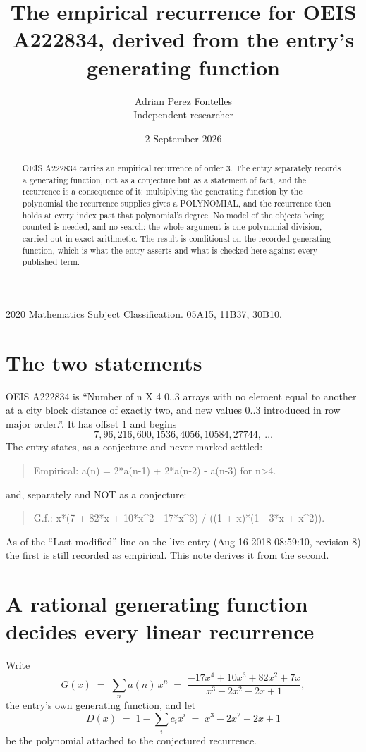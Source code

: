 \documentclass[11pt,a4paper]{article}
\title{The empirical recurrence for OEIS A222834, derived from the entry's generating function}
\author{Adrian Perez Fontelles\\ \small Independent researcher}
\date{2 September 2026}
\theoremstyle{plain}
\theoremstyle{definition}
\begin{document}
\maketitle

\begin{abstract}
OEIS A222834 carries an empirical recurrence of order $3$. The entry separately records a
generating function, not as a conjecture but as a statement of fact, and the recurrence is a
consequence of it: multiplying the generating function by the polynomial the recurrence
supplies gives a POLYNOMIAL, and the recurrence then holds at every index past that
polynomial's degree. No model of the objects being counted is needed, and no search: the
whole argument is one polynomial division, carried out in exact arithmetic. The result is
conditional on the recorded generating function, which is what the entry asserts and what is
checked here against every published term.
\end{abstract}

\noindent\small 2020 Mathematics Subject Classification. 05A15, 11B37, 30B10.\normalsize

\section{The two statements}

OEIS A222834 is ``Number of n X 4 0..3 arrays with no element equal to another at a city block distance of exactly two, and new values 0..3 introduced in row major order.''. It has offset $1$ and begins
\[
7, 96, 216, 600, 1536, 4056, 10584, 27744,\ \dots
\]
The entry states, as a conjecture and never marked settled:
\begin{quote}
Empirical: a(n) = 2*a(n-1) + 2*a(n-2) - a(n-3) for n>4.
\end{quote}
and, separately and NOT as a conjecture:
\begin{quote}
G.f.: x*(7 + 82*x + 10*x\^{}2 - 17*x\^{}3) / ((1 + x)*(1 - 3*x + x\^{}2)).
\end{quote}
As of the ``Last modified'' line on the live entry (Aug 16 2018 08:59:10, revision 8) the first is still
recorded as empirical. This note derives it from the second.

\section{A rational generating function decides every linear recurrence}

Write
\[
G(x)\;=\;\sum_{n}a(n)\,x^{n}\;=\;\frac{- 17 x^{4} + 10 x^{3} + 82 x^{2} + 7 x}{x^{3} - 2 x^{2} - 2 x + 1},
\]
the entry's own generating function, and let
\[
D(x)\;=\;1-\sum_i c_i x^{i}\;=\;x^{3} - 2 x^{2} - 2 x + 1
\]
be the polynomial attached to the conjectured recurrence.
\end{document}
